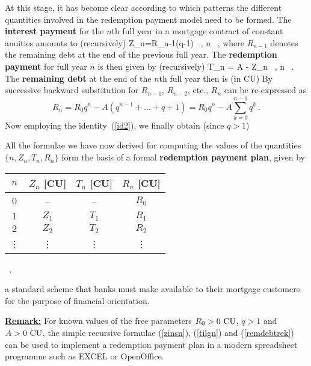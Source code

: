 %
At this stage, it has become clear according to which patterns the 
different quantities involved in the redemption payment model need 
to be formed. The {\bf interest payment} for the $n$th full year 
in a mortgage contract of constant anuities amounts to 
(recursively)
%
\be
{}
Z_{n}=R_{n-1}(q-1) \ , \quad n\in{} \ ,
\ee
%
where $R_{n-1}$ denotes the remaining debt at the end of the 
previous full year. The {\bf redemption payment} for full year $n$ 
is then given by (recursively)
%
\be
{}
T_{n} = A - Z_{n} \ , \quad n\in{} \ .
\ee
%
The {\bf remaining debt} at the end of the $n$th full year then is 
(in CU)
%
\be
{}
\ee
%
By successive backward substitution for $R_{n-1}$, $R_{n-2}$, etc.,
$R_{n}$ can be re-expressed as
%
\[
R_{n} = R_{0}q^{n}-A(q^{n-1}+\ldots+q+1)
= R_{0}q^{n}-A\sum_{k=0}^{n-1}q^{k} \ .
\]
%
Now employing the identity~(\ref{id2}), we finally obtain (since $q>1$)
%
\be
{}
\ee
%

\medskip
\noindent
All the formulae we have now derived
for computing the values of the quantities $\{n, Z_{n}, T_{n}, 
R_{n}\}$ form the basis of a formal {\bf redemption payment plan}, 
given by
%
\begin{center}
		\begin{tabular}{c||c|c|c}
		$n$ & $Z_{n}$ [CU] & $T_{n}$ [CU] & $R_{n}$ [CU] \\
		\hline\hline
		$0$ & -- & -- & $R_{0}$ \\
		$1$ & $Z_{1}$ & $T_{1}$ & $R_{1}$ \\
		$2$ & $Z_{2}$ & $T_{2}$ & $R_{2}$ \\
		\vdots & \vdots & \vdots & \vdots
		\end{tabular} \ ,
\end{center}
%
a standard scheme that banks must make available to their mortgage 
customers for the purpose of financial orientation.

\medskip
\noindent
\underline{\bf Remark:} For known values of the free parameters 
$R_{0}>0~{\rm CU}$, $q>1$ and $A>0~{\rm CU}$, the simple recursive 
formulae (\ref{zinsn}), (\ref{tilgn}) and (\ref{remdebtrek}) can 
be used to implement a redemption payment plan in a modern 
spreadsheet programme such as EXCEL or OpenOffice.

